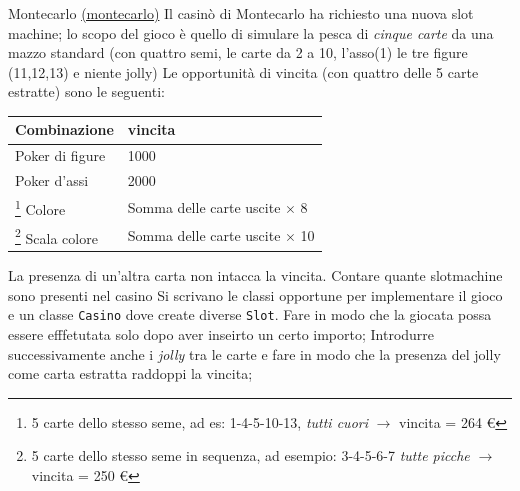 \begin{esercizio}{Montecarlo \href{run:./files/java/esercizi/montecarlo/}{(montecarlo)}}
	Il casinò di Montecarlo ha richiesto una nuova slot machine; lo scopo del gioco è quello di simulare la pesca di \textit{cinque carte} da una mazzo standard (con quattro semi, le carte da 2 a 10, l’asso(1) le tre figure (11,12,13) e niente jolly)
	\vskip3mm
	Le opportunità di vincita (con quattro delle 5 carte estratte) sono le seguenti:
	\begin{center}
		\begin{tabular}{l l}
			\toprule
			Combinazione                                                                                                                                & vincita                                 \\
			\midrule
			Poker di figure                                                                                                                             & 1000 \texteuro                          \\
			Poker d’assi                                                                                                                                & 2000 \texteuro                          \\
			\footnote{5 carte dello stesso seme, ad es: 1-4-5-10-13, \textit{tutti cuori} $ \rightarrow  $ vincita = 264 €} Colore                      & Somma delle carte uscite $ \times  $ 8  \\
			\footnote{5 carte dello stesso seme in sequenza, ad esempio: 3-4-5-6-7 \textit{tutte picche} $ \rightarrow  $ vincita = 250 €} Scala colore & Somma delle carte uscite $ \times  $ 10 \\
			\bottomrule
		\end{tabular}
	\end{center}


	La presenza di un’altra carta non intacca la vincita.
	\vskip3mm
	Contare quante slotmachine sono presenti nel casino
	\vskip3mm
	Si scrivano le classi opportune per implementare il gioco e un classe \verb|Casino| dove create diverse \verb|Slot|.
	\vskip3mm
	Fare in modo che la giocata possa essere efffetutata solo dopo aver inseirto un certo importo;
	\vskip3mm
	Introdurre successivamente anche i \textit{jolly} tra le carte e fare in modo che la presenza del jolly come carta estratta raddoppi la vincita;
\end{esercizio}


